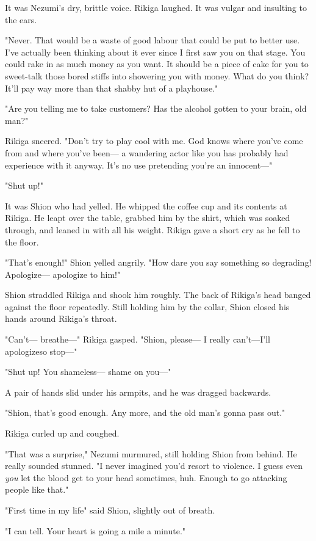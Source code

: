 It was Nezumi's dry, brittle voice. Rikiga laughed. It was vulgar and
insulting to the ears.

"Never. That would be a waste of good labour that could be put to better
use. I've actually been thinking about it ever since I first saw you on
that stage. You could rake in as much money as you want. It should be a
piece of cake for you to sweet-talk those bored stiffs into showering
you with money. What do you think? It'll pay way more than that shabby
hut of a playhouse."

"Are you telling me to take customers? Has the alcohol gotten to your
brain, old man?"

Rikiga sneered. "Don't try to play cool with me. God knows where you've
come from and where you've been--- a wandering actor like you has probably
had experience with it anyway. It's no use pretending you're an
innocent---"

"Shut up!"

It was Shion who had yelled. He whipped the coffee cup and its contents
at Rikiga. He leapt over the table, grabbed him by the shirt, which was
soaked through, and leaned in with all his weight. Rikiga gave a short
cry as he fell to the floor.

"That's enough!" Shion yelled angrily. "How dare you say something so
degrading! Apologize--- apologize to him!"

Shion straddled Rikiga and shook him roughly. The back of Rikiga's head
banged against the floor repeatedly. Still holding him by the collar,
Shion closed his hands around Rikiga's throat.

"Can't--- breathe---" Rikiga gasped. "Shion, please--- I really can't---I'll
apologize\el so stop---"

"Shut up! You shameless--- shame on you---"

A pair of hands slid under his armpits, and he was dragged backwards.

"Shion, that's good enough. Any more, and the old man's gonna pass out."

Rikiga curled up and coughed.

"That was a surprise," Nezumi murmured, still holding Shion from behind.
He really sounded stunned. "I never imagined you'd resort to violence. I
guess even \emph{you} let the blood get to your head sometimes, huh. Enough to
go attacking people like that."

"\el First time in my life\el " said Shion, slightly out of breath.

"I can tell. Your heart is going a mile a minute."

